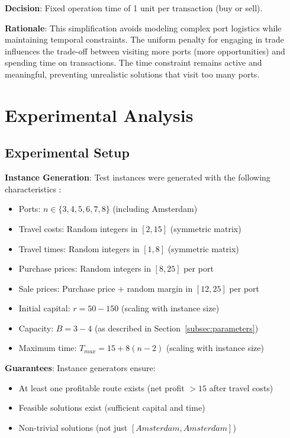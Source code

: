 \documentclass[12pt]{article}
\begin{document}
\textbf{Decision}: Fixed operation time of 1 unit per transaction (buy or sell).

\textbf{Rationale}: This simplification avoids modeling complex port logistics while maintaining temporal constraints. The uniform penalty for engaging in trade influences the trade-off between visiting more ports (more opportunities) and spending time on transactions. The time constraint remains active and meaningful, preventing unrealistic solutions that visit too many ports.

\section{Experimental Analysis}
\label{sec:experimental}

\subsection{Experimental Setup}
\label{subsec:setup}

\textbf{Instance Generation}: Test instances were generated with the following characteristics \cite{mcgeoch2012}:
\begin{itemize}
    \item Ports: $n \in \{3, 4, 5, 6, 7, 8\}$ (including Amsterdam)
    \item Travel costs: Random integers in $[2, 15]$ (symmetric matrix)
    \item Travel times: Random integers in $[1, 8]$ (symmetric matrix)
    \item Purchase prices: Random integers in $[8, 25]$ per port
    \item Sale prices: Purchase price + random margin in $[12, 25]$ per port
    \item Initial capital: $r = 50-150$ (scaling with instance size)
    \item Capacity: $B = 3-4$ (as described in Section~\ref{subsec:parameters})
    \item Maximum time: $T_{max} = 15 + 8(n-2)$ (scaling with instance size)
\end{itemize}

\textbf{Guarantees}: Instance generators ensure:
\begin{itemize}
    \item At least one profitable route exists (net profit $> 15$ after travel costs)
    \item Feasible solutions exist (sufficient capital and time)
    \item Non-trivial solutions (not just $[Amsterdam, Amsterdam]$)
\end{itemize}
\end{document}
